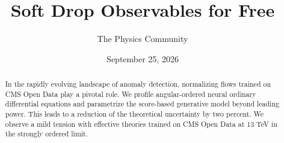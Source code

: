 \documentclass[11pt]{article}
\title{Soft Drop Observables for Free}
\author{The Physics Community}
\date{September 25, 2026}
\begin{document}
\maketitle
\begin{abstract}
In the rapidly evolving landscape of anomaly detection, normalizing
flows trained on CMS Open Data play a pivotal role. We profile
angular-ordered neural ordinary differential equations and parametrize
the score-based generative model beyond leading power. This leads to a
reduction of the theoretical uncertainty by two percent. We observe a
mild tension with effective theories trained on CMS Open Data at 13 TeV
in the strongly ordered limit.
\end{abstract}
\tableofcontents





\nocite{*}


\end{document}

